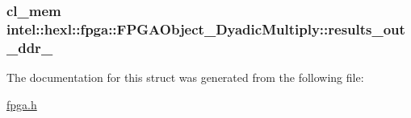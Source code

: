 \hypertarget{structintel_1_1hexl_1_1fpga_1_1FPGAObject__DyadicMultiply_a5e4758ba8ce2f59c59c214783b85c9c4}{
\subsubsection[{results\-\_\-out\-\_\-ddr\-\_\-}]{\setlength{\rightskip}{0pt plus 5cm}cl\-\_\-mem intel\-::hexl\-::fpga\-::\-F\-P\-G\-A\-Object\-\_\-\-Dyadic\-Multiply\-::results\-\_\-out\-\_\-ddr\-\_\-}}\label{structintel_1_1hexl_1_1fpga_1_1FPGAObject__DyadicMultiply_a5e4758ba8ce2f59c59c214783b85c9c4}


The documentation for this struct was generated from the following file\-:\begin{DoxyCompactItemize}
\item 
\hyperlink{fpga_8h}{fpga.\-h}\end{DoxyCompactItemize}
